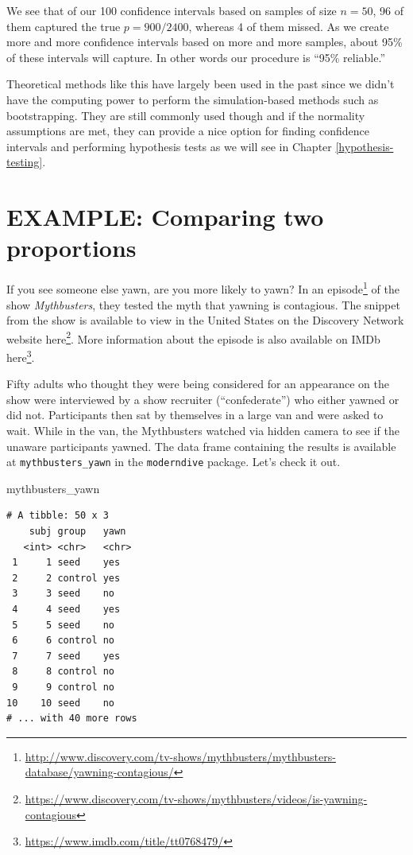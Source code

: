 \documentclass[12pt,]{krantz}
\makeatletter
\newenvironment{Shaded}{\begin{snugshade}}{\end{snugshade}}
\newcommand{\NormalTok}[1]{#1}
\renewcommand{\href}[2]{#2\footnote{\url{#1}}}
\newenvironment{kframe}{%
\medskip{}
\setlength{\fboxsep}{.8em}
 \def\at@end@of@kframe{}%
 \ifinner\ifhmode%
  \def\at@end@of@kframe{\end{minipage}}%
  \begin{minipage}{\columnwidth}%
 \fi\fi%
 \def\FrameCommand##1{\hskip\@totalleftmargin \hskip-\fboxsep
 \colorbox{shadecolor}{##1}\hskip-\fboxsep
     \hskip-\linewidth \hskip-\@totalleftmargin \hskip\columnwidth}%
 \MakeFramed {\advance\hsize-\width
   \@totalleftmargin\z@ \linewidth\hsize
   \@setminipage}}%
 {\par\unskip\endMakeFramed%
 \at@end@of@kframe}
\renewenvironment{Shaded}{\begin{kframe}}{\end{kframe}}
\makeatother
\begin{document}
We see that of our 100 confidence intervals based on samples of size
\(n=50\), 96 of them captured the true \(p = 900/2400\), whereas 4 of
them missed. As we create more and more confidence intervals based on
more and more samples, about 95\% of these intervals will capture. In
other words our procedure is ``95\% reliable.''

Theoretical methods like this have largely been used in the past since
we didn't have the computing power to perform the simulation-based
methods such as bootstrapping. They are still commonly used though and
if the normality assumptions are met, they can provide a nice option for
finding confidence intervals and performing hypothesis tests as we will
see in Chapter \ref{hypothesis-testing}.

\section{EXAMPLE: Comparing two
proportions}\label{example-comparing-two-proportions}

If you see someone else yawn, are you more likely to yawn? In an
\href{http://www.discovery.com/tv-shows/mythbusters/mythbusters-database/yawning-contagious/}{episode}
of the show \emph{Mythbusters}, they tested the myth that yawning is
contagious. The snippet from the show is available to view in the United
States on the Discovery Network website
\href{https://www.discovery.com/tv-shows/mythbusters/videos/is-yawning-contagious}{here}.
More information about the episode is also available on IMDb
\href{https://www.imdb.com/title/tt0768479/}{here}.

Fifty adults who thought they were being considered for an appearance on
the show were interviewed by a show recruiter (``confederate'') who
either yawned or did not. Participants then sat by themselves in a large
van and were asked to wait. While in the van, the Mythbusters watched
via hidden camera to see if the unaware participants yawned. The data
frame containing the results is available at \texttt{mythbusters\_yawn}
in the \texttt{moderndive} package. Let's check it out.

\begin{Shaded}
\begin{Highlighting}[]
\NormalTok{mythbusters_yawn}
\end{Highlighting}
\end{Shaded}

\begin{verbatim}
# A tibble: 50 x 3
    subj group   yawn 
   <int> <chr>   <chr>
 1     1 seed    yes  
 2     2 control yes  
 3     3 seed    no   
 4     4 seed    yes  
 5     5 seed    no   
 6     6 control no   
 7     7 seed    yes  
 8     8 control no   
 9     9 control no   
10    10 seed    no   
# ... with 40 more rows
\end{verbatim}
\end{document}
